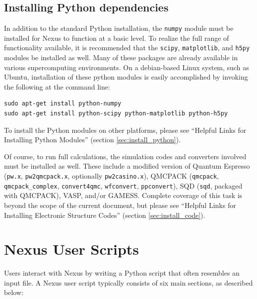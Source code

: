 \documentclass[oneside,11pt]{memoir}
\numberwithin{equation}{section}
\begin{document}
\section{Installing Python dependencies}
In addition to the standard Python installation, the \texttt{numpy} module must 
be installed for Nexus to function at a basic level.  To realize 
the full range of functionality available, it is recommended that the 
\texttt{scipy}, \texttt{matplotlib}, and \texttt{h5py} modules be installed as 
well.  Many of these packages are already available in various supercomputing 
environments.  On a debian-based Linux system, such as Ubuntu, installation of 
these python modules is easily accomplished by invoking the following at the 
command line:
\begin{shaded}
\begin{verbatim}
sudo apt-get install python-numpy
sudo apt-get install python-scipy python-matplotlib python-h5py 
\end{verbatim}
\end{shaded}
\noindent
To install the Python modules on other platforms, please see 
``Helpful Links for Installing Python Modules'' (section \ref{sec:install_python}).

Of course, to run full calculations, the simulation codes and converters 
involved must be installed as well.  These include a modified version of 
Quantum Espresso (\texttt{pw.x}, \texttt{pw2qmcpack.x}, optionally 
\texttt{pw2casino.x}), QMCPACK (\texttt{qmcpack}, \texttt{qmcpack\_complex}, \texttt{convert4qmc}, \texttt{wfconvert}, \texttt{ppconvert}), 
SQD (\texttt{sqd}, packaged with QMCPACK), VASP, and/or GAMESS.  
Complete coverage of this task is beyond the scope of the current document, but 
please see ``Helpful Links for Installing Electronic Structure Codes'' 
(section \ref{sec:install_code}).






\pagebreak
\chapter{Nexus User Scripts} \label{sec:user_scripts}

Users interact with Nexus by writing a Python script that often resembles an input file.  A Nexus user script typically consists of six main sections, as described below:
\end{document}
